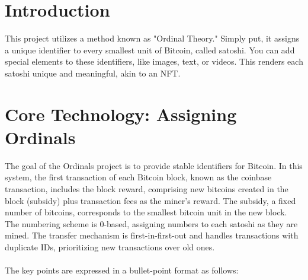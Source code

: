 

\section{Introduction}
This project utilizes a method known as "Ordinal Theory." 
Simply put, 
it assigns a unique identifier to every smallest unit of Bitcoin, called satoshi.
You can add special elements to these identifiers, 
like images, text, or videos. This renders each satoshi unique and meaningful, 
akin to an NFT.

\section{Core Technology: Assigning Ordinals}
The goal of the Ordinals project is to provide stable identifiers for Bitcoin. 
In this system, the first transaction of each Bitcoin block, 
known as the coinbase transaction, includes the block reward, 
comprising new bitcoins created in the block (subsidy) plus transaction fees as the miner's reward. 
The subsidy, a fixed number of bitcoins, 
corresponds to the smallest bitcoin unit in the new block. 
The numbering scheme is 0-based, 
assigning numbers to each satoshi as they are mined. 
The transfer mechanism is first-in-first-out and handles transactions with duplicate IDs, 
prioritizing new transactions over old ones.\\ \\
The key points are expressed in a bullet-point format as follows:
